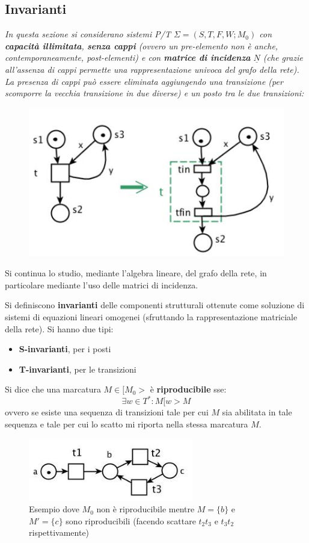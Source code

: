 \documentclass[a4paper,12pt, oneside]{book}
\begin{document}
\subsection{Invarianti}
\emph{In questa sezione si considerano sistemi P/T $\Sigma=(S,T,F,W;M_0)$ con
  \textbf{capacità illimitata}, \textbf{senza cappi} (ovvero un pre-elemento non
  è anche, contemporaneamente, post-elementi) e con \textbf{matrice di
    incidenza} $\underline{N}$ (che grazie all'assenza di cappi permette una
  rappresentazione univoca del grafo della rete). La presenza di cappi può
  essere eliminata aggiungendo una transizione (per scomporre la vecchia
  transizione in due diverse) e un posto tra le due transizioni:}
\begin{figure}[H]
  \centering
  \includegraphics[scale = 0.5]{img/cap.jpg}
\end{figure}
Si continua lo studio, mediante l'algebra lineare, del grafo della rete, in
particolare mediante l'uso delle matrici di incidenza.
\newpage
\begin{definizione}
  Si definiscono \textbf{invarianti} delle componenti strutturali ottenute come
  soluzione di sistemi di equazioni lineari omogenei (sfruttando la
  rappresentazione matriciale della rete). Si hanno due tipi:
  \begin{itemize}
    \item \textbf{S-invarianti}, per i posti
    \item \textbf{T-invarianti}, per le transizioni
  \end{itemize}
\end{definizione}
\begin{definizione}
  Si dice che una marcatura $M\in[M_0>$ è \textbf{riproducibile} sse:
  \[\exists w\in T^*:M[w>M\]
  ovvero se esiste una sequenza di transizioni tale per cui $M$ sia abilitata in
  tale sequenza e tale per cui lo scatto mi riporta nella stessa marcatura $M$.
  \begin{figure}[H]
    \centering
    \includegraphics[scale = 0.5]{img/ti.jpg}
    \caption{Esempio dove $M_0$ non è riproducibile mentre $M=\{b\}$ e\\
      $M'=\{c\}$ sono riproducibili (facendo scattare $t_2t_3$ e $t_3t_2$
      rispettivamente)} 
  \end{figure}
\end{definizione}
\end{document}
